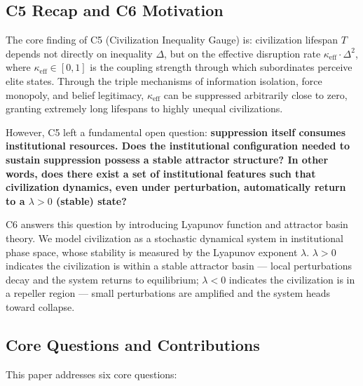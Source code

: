 \documentclass[12pt,a4paper]{article}
\theoremstyle{definition}
\newcommand{\coupling}{\kappa}
\newcommand{\ineq}{\Delta}
\newcommand{\lb}{\lambda}
\begin{document}
\subsection{C5 Recap and C6 Motivation}

\noindent
The core finding of C5 (Civilization Inequality Gauge) is: civilization lifespan $T$ depends not directly on inequality $\ineq$, but on the effective disruption rate $\coupling_{\text{eff}} \cdot \ineq^2$, where $\coupling_{\text{eff}} \in [0,1]$ is the coupling strength through which subordinates perceive elite states. Through the triple mechanisms of information isolation, force monopoly, and belief legitimacy, $\coupling_{\text{eff}}$ can be suppressed arbitrarily close to zero, granting extremely long lifespans to highly unequal civilizations.

However, C5 left a fundamental open question: \textbf{suppression itself consumes institutional resources. Does the institutional configuration needed to sustain suppression possess a stable attractor structure? In other words, does there exist a set of institutional features such that civilization dynamics, even under perturbation, automatically return to a $\lb>0$ (stable) state?}

C6 answers this question by introducing Lyapunov function and attractor basin theory. We model civilization as a stochastic dynamical system in institutional phase space, whose stability is measured by the Lyapunov exponent $\lb$. $\lb > 0$ indicates the civilization is within a stable attractor basin --- local perturbations decay and the system returns to equilibrium; $\lb < 0$ indicates the civilization is in a repeller region --- small perturbations are amplified and the system heads toward collapse.

\subsection{Core Questions and Contributions}
\label{sec:questions}

\noindent
This paper addresses six core questions:
\end{document}
